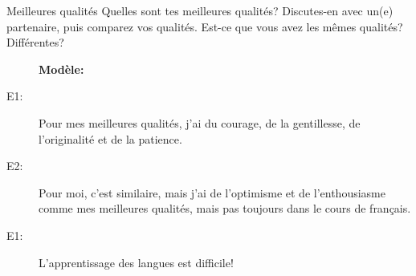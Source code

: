 \begin{frame}{Meilleures qualités}
  Quelles sont tes meilleures qualités?
  Discutes-en avec un(e) partenaire, puis comparez vos qualités.
  Est-ce que vous avez les mêmes qualités? Différentes?
  \begin{description}
    \item[] \textbf{Modèle:}
    \item[E1:] Pour mes meilleures qualités, j'ai du courage, de la gentillesse, de l'originalité et de la patience.
    \item[E2:] Pour moi, c'est similaire, mais j'ai de l'optimisme et de l'enthousiasme comme mes meilleures qualités, mais pas toujours dans le cours de français.
    \item[E1:] L'apprentissage des langues est difficile!
  \end{description}
\end{frame}